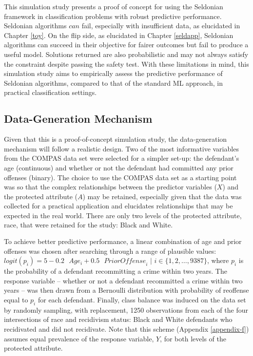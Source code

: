 \documentclass[12pt, twoside]{amherstthesis}
\begin{document}
This simulation study presents a proof of concept for using the Seldonian framework in classification problems with robust predictive performance. Seldonian algorithms \(\textit{can}\) fail, especially with insufficient data, as elucidated in Chapter \ref{toy}. On the flip side, as elucidated in Chapter \ref{seldapp}, Seldonian algorithms can succeed in their objective for fairer outcomes but fail to produce a useful model. Solutions returned are also probabilistic and may not always satisfy the constraint despite passing the safety test. With these limitations in mind, this simulation study aims to empirically assess the predictive performance of Seldonian algorithms, compared to that of the standard ML approach, in practical classification settings.

\hypertarget{data-gen}{%
\subsection{Data-Generation Mechanism}\label{data-gen}}

Given that this is a proof-of-concept simulation study, the data-generation mechanism will follow a realistic design. Two of the most informative variables from the COMPAS data set were selected for a simpler set-up: the defendant's age (continuous) and whether or not the defendant had committed any prior offenses (binary). The choice to use the COMPAS data set as a starting point was so that the complex relationships between the predictor variables (\(X\)) and the protected attribute (\(A\)) may be retained, especially given that the data was collected for a practical application and elucidates relationships that may be expected in the real world. There are only two levels of the protected attribute, race, that were retained for the study: Black and White.

To achieve better predictive performance, a linear combination of age and prior offenses was chosen after searching through a range of plausible values: \(logit(p_i) = 5 - 0.2 \text{ }Age_i + 0.5 \text{ } \textit{PriorOffense}_i \text{ | } i \in \{1,2, \ldots, 9387\}\), where \(p_i\) is the probability of a defendant recommitting a crime within two years. The response variable -- whether or not a defendant recommitted a crime within two years -- was then drawn from a Bernoulli distribution with probability of reoffense equal to \(p_i\) for each defendant. Finally, class balance was induced on the data set by randomly sampling, with replacement, 1250 observations from each of the four intersections of race and recidivism status: Black and White defendants who recidivated and did not recidivate. Note that this scheme (Appendix \ref{appendix-f}) assumes equal prevalence of the response variable, \(Y\), for both levels of the protected attribute.
\end{document}
